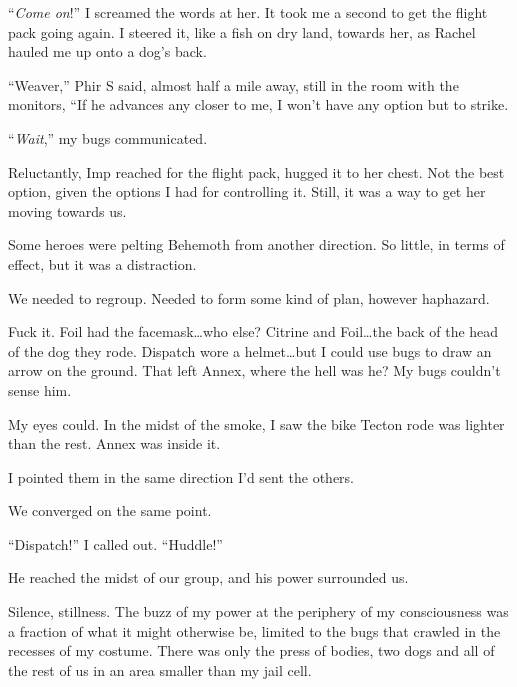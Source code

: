 ``\emph{Come on}!'' I screamed the words at her.  It took me a second to get the flight pack going again.  I steered it, like a fish on dry land, towards her, as Rachel hauled me up onto a dog's back.



``Weaver,'' Phir S said, almost half a mile away, still in the room with the monitors, ``If he advances any closer to me, I won't have any option but to strike.



``\emph{Wait},'' my bugs communicated.



Reluctantly, Imp reached for the flight pack, hugged it to her chest.  Not the best option, given the options I had for controlling it.  Still, it was a way to get her moving towards us.



Some heroes were pelting Behemoth from another direction.  So little, in terms of effect, but it was a distraction.



We needed to regroup.  Needed to form some kind of plan, however haphazard.



Fuck it.  Foil had the facemask\ldots who else?  Citrine and Foil\ldots the back of the head of the dog they rode.  Dispatch wore a helmet\ldots but I could use bugs to draw an arrow on the ground.  That left Annex, where the hell was he?  My bugs couldn't sense him.



My eyes could.  In the midst of the smoke, I saw the bike Tecton rode was lighter than the rest.  Annex was inside it.



I pointed them in the same direction I'd sent the others.



We converged on the same point.



``Dispatch!'' I called out.  ``Huddle!''



He reached the midst of our group, and his power surrounded us.



Silence, stillness.  The buzz of my power at the periphery of my consciousness was a fraction of what it might otherwise be, limited to the bugs that crawled in the recesses of my costume.  There was only the press of bodies, two dogs and all of the rest of us in an area smaller than my jail cell.



